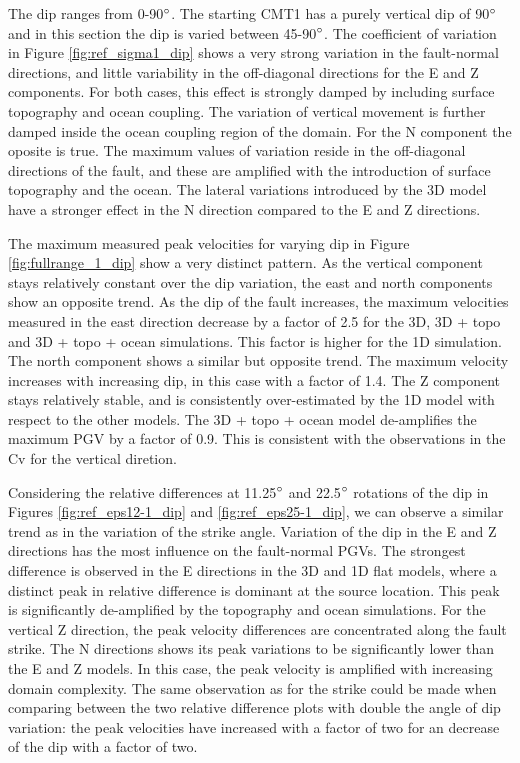 \documentclass[../Text/00main.tex]{subfiles}
\begin{document}
The dip ranges from 0-90$\degree$. The starting CMT1 has a purely vertical dip of 90$\degree$ and in this section the dip is varied between 45-90$\degree$. The coefficient of variation in Figure \ref{fig:ref_sigma1_dip} shows a very strong variation in the fault-normal directions, and little variability in the off-diagonal directions for the E and Z components. For both cases, this effect is strongly damped by including surface topography and ocean coupling. The variation of vertical movement is further damped inside the ocean coupling region of the domain. For the N component the oposite is true. The maximum values of variation reside in the off-diagonal directions of the fault, and these are amplified with the introduction of surface topography and the ocean. The lateral variations introduced by the 3D model have a stronger effect in the N direction compared to the E and Z directions. 

The maximum measured peak velocities for varying dip in Figure \ref{fig:fullrange_1_dip} show a very distinct pattern. As the vertical component stays relatively constant over the dip variation, the east and north components show an opposite trend. As the dip of the fault increases, the maximum velocities measured in the east direction decrease by a factor of 2.5 for the 3D, 3D + topo and 3D + topo + ocean simulations. This factor is higher for the 1D simulation. The north component shows a similar but opposite trend. The maximum velocity increases with increasing dip, in this case with a factor of 1.4. The Z component stays relatively stable, and is consistently over-estimated by the 1D model with respect to the other models. The 3D + topo + ocean model de-amplifies the maximum PGV by a factor of 0.9. This is consistent with the observations in the $\text{Cv}$ for the vertical diretion.

Considering the relative differences at 11.25$\degree$ and 22.5$\degree$ rotations of the dip in Figures \ref{fig:ref_eps12-1_dip} and \ref{fig:ref_eps25-1_dip}, we can observe a similar trend as in the variation of the strike angle. Variation of the dip in the E and Z directions has the most influence on the fault-normal PGVs. The strongest difference is observed in the E directions in the 3D and 1D flat models, where a distinct peak in relative difference is dominant at the source location. This peak is significantly de-amplified by the topography and ocean simulations. For the vertical Z direction, the peak velocity differences are concentrated along the fault strike. The N directions shows its peak variations to be significantly lower than the E and Z models. In this case, the peak velocity is amplified with increasing domain complexity. The same observation as for the strike could be made when comparing between the two relative difference plots with double the angle of dip variation: the peak velocities have increased with a factor of two for an decrease of the dip with a factor of two. 
\end{document}
